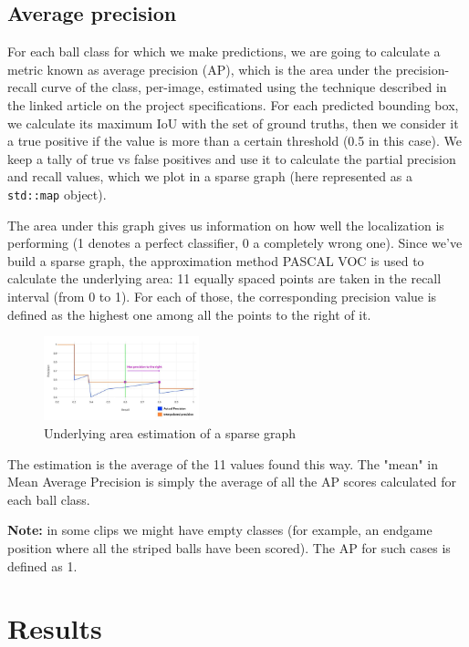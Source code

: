 \subsection{Average precision}

For each ball class for which we make predictions, we are going to 
calculate a metric known as average precision (AP), which is the 
area under the precision-recall curve of the class, per-image, estimated 
using the technique described in the linked article on the project specifications.
For each predicted bounding box, we calculate its maximum IoU with the 
set of ground truths, then we consider it a true positive if the 
value is more than a certain threshold (0.5 in this case). 
We keep a tally of true vs false positives and use it to calculate 
the partial precision and recall values, which we plot in a sparse 
graph (here represented as a \verb|std::map| object).

The area under this graph gives us information on how well the 
localization is performing (1 denotes a perfect classifier, 0 a 
completely wrong one). Since we've build a sparse graph, the 
approximation method PASCAL VOC is used to calculate the 
underlying area: 11 equally spaced points are taken in the 
recall interval (from 0 to 1). For each of those, the corresponding 
precision value is defined as the highest one among all the 
points to the right of it.

\begin{figure}[h]
    \centering
    \includegraphics[width=0.4\textwidth]{./imgs/average_precision_graph.jpg}
    \caption{Underlying area estimation of a sparse graph}
\end{figure}

The estimation is the average of the 11 values found this way. The "mean" 
in Mean Average Precision is simply the average of all the AP scores 
calculated for each ball class.

\textbf{Note:} in some clips we might have empty classes (for example, an 
endgame position where all the striped balls have been scored). The 
AP for such cases is defined as 1.


\vspace{16cm}
\section{Results}

